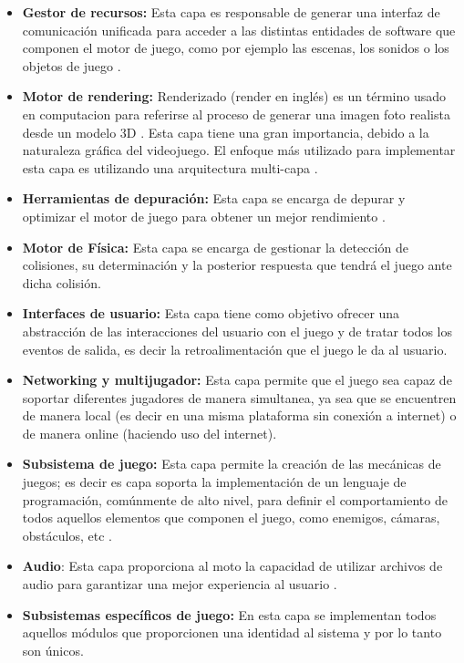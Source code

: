 \begin{itemize}
	 	\item \textbf{Gestor de recursos:} Esta capa es responsable de generar una 
	 	interfaz de comunicación unificada para acceder a las distintas entidades 
	 	de software que componen el motor de juego, como por ejemplo las escenas, 
	 	los sonidos o los objetos de juego \cite{Ref:ArquMotor}.
	 	\item \textbf{Motor de rendering:} Renderizado (render en inglés) es un término 
	 	usado en computacion para referirse al proceso de generar una imagen foto 
	 	realista desde un modelo 3D \cite{Ref:Render}. Esta capa tiene una gran 
	 	importancia, debido a la naturaleza gráfica del videojuego. El enfoque más 
	 	utilizado para implementar esta capa es utilizando una arquitectura multi-capa
	 	\cite{Ref:ArquMotor}.
	 	\item \textbf{Herramientas de depuración:} Esta capa se encarga de depurar 
	 	y optimizar el motor de juego para obtener un mejor rendimiento
	 	\cite{Ref:ArquMotor}.
	 	\item \textbf{Motor de Física:} Esta capa se encarga de gestionar la detección 
	 	de colisiones, su determinación y la posterior respuesta que tendrá el juego 
	 	ante dicha colisión.
	 	\item \textbf{Interfaces de usuario:} Esta capa tiene como objetivo ofrecer 
	 	una abstracción de las interacciones del usuario con el juego y de tratar 
	 	todos los eventos de salida, es decir la retroalimentación que el juego le 
	 	da al usuario\cite{Ref:ArquMotor}.
	 	\item \textbf{Networking y multijugador:} Esta capa permite que el juego sea 
	 	capaz de soportar diferentes jugadores de manera simultanea, ya sea que se 
	 	encuentren de manera local (es decir en una misma plataforma sin conexión 
	 	a internet) o de manera online (haciendo uso del internet)\cite{Ref:ArquMotor}.
	 	\item \textbf{Subsistema de juego:} Esta capa permite la creación de las 
	 	mecánicas de juegos; es decir es capa soporta la implementación de un 
	 	lenguaje de programación, comúnmente de alto nivel, para definir el 
	 	comportamiento de todos aquellos elementos que componen el juego, como 
	 	enemigos, cámaras, obstáculos, etc \cite{Ref:ArquMotor}.
	 	\item \textbf{Audio}: Esta capa proporciona al moto la capacidad de utilizar 
	 	archivos de audio para garantizar una mejor experiencia al usuario
	 	\cite{Ref:ArquMotor}.
	 	\item \textbf{Subsistemas específicos de juego:} En esta capa se implementan 
	 	todos aquellos módulos que proporcionen una identidad al sistema y por lo tanto 
	 	son únicos\cite{Ref:ArquMotor}.
	 \end{itemize}	
 
